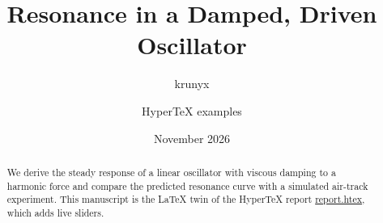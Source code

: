 \documentclass[11pt]{article}
\title{Resonance in a Damped, Driven Oscillator}
\author{krunyx \and HyperTeX examples}
\date{November 2026}
\begin{document}
\maketitle

\begin{abstract}
We derive the steady response of a linear oscillator with viscous damping to a harmonic force and
compare the predicted resonance curve with a simulated air-track experiment. This manuscript is the
LaTeX twin of the HyperTeX report
\href{https://krunyx.com/examples/oscillator/report.htex}{report.htex}, which adds live sliders.
\end{abstract}







\end{document}
